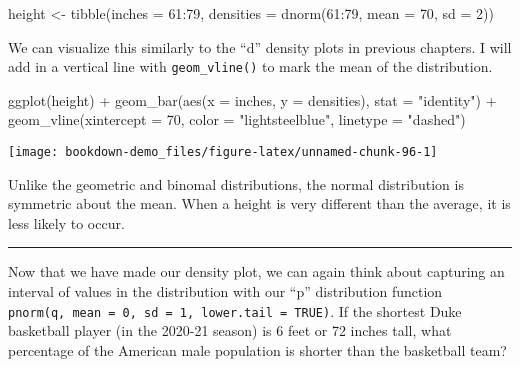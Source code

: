 \documentclass[
]{book}
\newenvironment{Shaded}{\begin{snugshade}}{\end{snugshade}}
\newcommand{\AttributeTok}[1]{\textcolor[rgb]{0.77,0.63,0.00}{#1}}
\newcommand{\DecValTok}[1]{\textcolor[rgb]{0.00,0.00,0.81}{#1}}
\newcommand{\FunctionTok}[1]{\textcolor[rgb]{0.00,0.00,0.00}{#1}}
\newcommand{\NormalTok}[1]{#1}
\newcommand{\OtherTok}[1]{\textcolor[rgb]{0.56,0.35,0.01}{#1}}
\newcommand{\SpecialCharTok}[1]{\textcolor[rgb]{0.00,0.00,0.00}{#1}}
\newcommand{\StringTok}[1]{\textcolor[rgb]{0.31,0.60,0.02}{#1}}
\begin{document}
\begin{Shaded}
\begin{Highlighting}[]
\NormalTok{height }\OtherTok{\textless{}{-}} \FunctionTok{tibble}\NormalTok{(}\AttributeTok{inches =} \DecValTok{61}\SpecialCharTok{:}\DecValTok{79}\NormalTok{,}
                 \AttributeTok{densities =} \FunctionTok{dnorm}\NormalTok{(}\DecValTok{61}\SpecialCharTok{:}\DecValTok{79}\NormalTok{, }\AttributeTok{mean =} \DecValTok{70}\NormalTok{, }\AttributeTok{sd =} \DecValTok{2}\NormalTok{))}
\end{Highlighting}
\end{Shaded}

We can visualize this similarly to the ``d'' density plots in previous chapters. I will add in a vertical line with \texttt{geom\_vline()} to mark the mean of the distribution.

\begin{Shaded}
\begin{Highlighting}[]
\FunctionTok{ggplot}\NormalTok{(height) }\SpecialCharTok{+}
  \FunctionTok{geom\_bar}\NormalTok{(}\FunctionTok{aes}\NormalTok{(}\AttributeTok{x =}\NormalTok{ inches, }\AttributeTok{y =}\NormalTok{ densities), }\AttributeTok{stat =} \StringTok{"identity"}\NormalTok{) }\SpecialCharTok{+}
  \FunctionTok{geom\_vline}\NormalTok{(}\AttributeTok{xintercept =} \DecValTok{70}\NormalTok{, }\AttributeTok{color =} \StringTok{"lightsteelblue"}\NormalTok{, }\AttributeTok{linetype =} \StringTok{"dashed"}\NormalTok{)}
\end{Highlighting}
\end{Shaded}

\begin{center}\texttt{[image: bookdown-demo\_files/figure-latex/unnamed-chunk-96-1]} \end{center}

Unlike the geometric and binomal distributions, the normal distribution is symmetric about the mean. When a height is very different than the average, it is less likely to occur.

\begin{center}\rule{0.5\linewidth}{0.5pt}\end{center}

Now that we have made our density plot, we can again think about capturing an interval of values in the distribution with our ``p'' distribution function \texttt{pnorm(q,\ mean\ =\ 0,\ sd\ =\ 1,\ lower.tail\ =\ TRUE)}. If the shortest Duke basketball player (in the 2020-21 season) is 6 feet or 72 inches tall, what percentage of the American male population is shorter than the basketball team?
\end{document}
